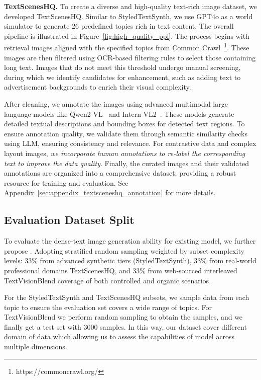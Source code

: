 


\textbf{TextScenesHQ.}
To create a diverse and high-quality text-rich image dataset, we developed TextScenesHQ. 
Similar to StyledTextSynth, we use GPT4o as a world simulator to generate 26 predefined topics rich in text content. 
The overall pipeline is illustrated in Figure~\ref{fig:high_quality_ppl}.
The process begins with retrieval images aligned with the specified topics from Common Crawl~\footnote{https://commoncrawl.org/}. 
These images are then filtered using OCR-based filtering rules to select those containing long text. 
Images that do not meet this threshold undergo manual screening, during which we identify candidates for enhancement, such as adding text to advertisement backgrounds to enrich their visual complexity.

After cleaning, we annotate the images using advanced multimodal large language models like Qwen2-VL~\cite{qwen2_vl} and Intern-VL2~\cite{internvl}. 
These models generate detailed textual descriptions and bounding boxes for detected text regions. 
To ensure annotation quality, we validate them through semantic similarity checks using LLM, ensuring consistency and relevance.
For contrastive data and complex layout images, \textit{we incorporate human annotations to re-label the corresponding text to improve the data quality}.
Finally, the curated images and their validated annotations are organized into a comprehensive dataset, providing a robust resource for training and evaluation.
See Appendix~\ref{sec:appendix_textsceneshq_annotation} for more details.

\subsection{Evaluation Dataset Split}
To evaluate the dense-text image generation ability for existing model, we further propose \EvalDatasetName.
Adopting stratified random sampling weighted by subset complexity levels: 33\% from advanced synthetic tiers (StyledTextSynth), 33\% from real-world professional domains TextScenesHQ, and 33\% from web-sourced interleaved TextVisionBlend coverage of both controlled and organic scenarios.

For the StyledTextSynth and TextScenesHQ subsets, we sample data from each topic to ensure the evaluation set covers a wide range of topics.
For TextVisionBlend we perform random sampling to obtain the samples, and we finally get a test set with 3000 samples.
In this way, our dataset cover different domain of data which allowing us to assess the capabilities of model across multiple dimensions. 



